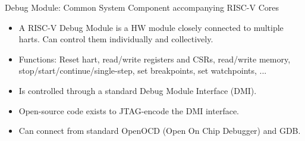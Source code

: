 \documentclass{article}
\begin{document}
\begin{center}
  {\Huge
    Debug Module: Common System Component accompanying RISC-V Cores}

  \vspace*{0.5in}


  \vspace*{0.5in}

  \begin{minipage}[t]{9in}
    \begin{itemize}\LARGE

    \item A RISC-V Debug Module is a HW module closely connected to
      multiple harts.  Can control them individually and collectively.

    \item Functions: Reset hart, read/write registers and CSRs,
      read/write memory, stop/start/continue/single-step, set
      breakpoints, set watchpoints, ...

    \item Is controlled through a standard Debug Module Interface
      (DMI).

    \item Open-source code exists to JTAG-encode the DMI interface.

    \item Can connect from standard OpenOCD (Open On Chip Debugger) and GDB.
    \end{itemize}
  \end{minipage}
\end{center}

\clearpage

\end{document}
